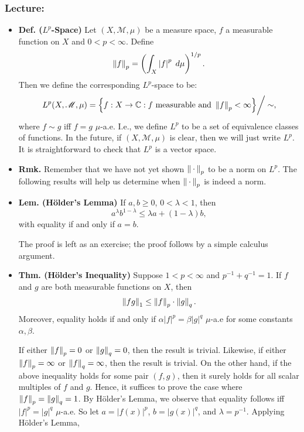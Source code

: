 \documentclass{article}
\begin{document}
\subsubsection{Lecture:} 
\begin{itemize}
	\item \textbf{Def. ($L^{p}$-Space)} Let $(X, \mathscr{M}, \mu)$ be a measure space, $f$ a measurable function on $X$ and $0 < p < \infty$. Define 
	\begin{equation}
		\left\Vert f \right\Vert_{p} = \left(\int_{X}\left| f \right|^{p}\;d\mu\right)^{1/p}. 
	\end{equation}
	Then we define the corresponding $L^{p}$-space to be: 
	\begin{equation}
		L^{p}(X, \mathscr{M}, \mu) = \brac*{f: X \to \mathbb{C}: f \text{ measurable and } \norm{f}_{p} < \infty}\bigg/ \sim, 
	\end{equation}
	where $f \sim g$ iff $f = g$ $\mu$-a.e. I.e., we define $L^{p}$ to be a set of equivalence classes of functions. In the future, if $(X, \mathscr{M}, \mu)$ is clear, then we will just write $L^{p}$. It is straightforward to check that $L^{p}$ is a vector space. 
	\item \textbf{Rmk.} Remember that we have not yet shown $\left\Vert \hspace{2pt}\cdot\hspace{2pt} \right\Vert_{p}$ to be a norm on $L^{p}$. The following results will help us determine when $\left\Vert \hspace{2pt}\cdot\hspace{2pt} \right\Vert_{p}$ is indeed a norm. 
	\item \textbf{Lem. (H\"older's Lemma)} If $a, b \geq 0$, $0 < \lambda < 1$, then 
	\begin{equation}
		a^{\lambda}b^{1 - \lambda} \leq \lambda a + (1 - \lambda)b,
	\end{equation}
	with equality if and only if $a = b$. 	\newline 
	\begin{solutions}
		The proof is left as an exercise; the proof follows by a simple calculus argument. 
	\end{solutions}
	\item \textbf{Thm. (H\"older's Inequality)} Suppose $1 < p < \infty$ and $p^{-1} + q^{-1} = 1$. If $f$ and $g$ are both measurable functions on $X$, then 
	\begin{equation}
		\left\Vert fg \right\Vert_{1} \leq \left\Vert f \right\Vert_{p} \cdot \left\Vert g \right\Vert_{q}. 
	\end{equation}
	Moreover, equality holds if and only if $\alpha |f|^{p} = \beta |g|^{q}$ $\mu$-a.e for some constants $\alpha, \beta$. \newline 
	\begin{solutions}
		If either $\left\Vert f \right\Vert_{p} = 0$ or $\left\Vert g \right\Vert_{q} = 0$, then the result is trivial. Likewise, if either $\left\Vert f \right\Vert_{p} = \infty$ or $\left\Vert f \right\Vert_{q} = \infty$, then the result is trivial. On the other hand, if the above inequality holds for some pair $(f,g)$, then it surely holds for all scalar multiples of $f$ and $g$. Hence, it suffices to prove the case where $\left\Vert f \right\Vert_{p} = \left\Vert g \right\Vert_{q} = 1$. By H\"older's Lemma, we observe that equality follows iff $|f|^{p} = |g|^{q}$ $\mu$-a.e. So let $a = |f(x)|^{p}$, $b = |g(x)|^{q}$, and $\lambda = p^{-1}$. Applying H\"older's Lemma, 

\end{solutions}
\end{itemize}
\end{document}
